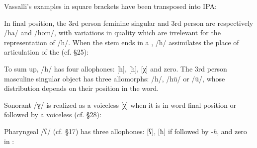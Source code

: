 \documentclass[output=paper]{langsci/langscibook}
\begin{document}
Vassalli's examples in square brackets have been transposed into IPA:



\puechlengths{2cm}{4.5cm}{2.5cm}{1.5cm}{1cm}{1cm}

\ea%
\begin{xlist}
\end{xlist}
\z

In final position, the 3rd person feminine singular and 3rd person  are respectively /ha/ and /hom/, with variations in  quality which are irrelevant for the representation of /h/. When the stem ends in a  , /h/ assimilates the place of articulation of the  (cf. §25):

\ea%
\begin{xlist}
\end{xlist}	
\z

To sum up, /h/ has four allophones: [h], [ħ], [χ] and zero. The 3rd person masculine singular object  has three allomorphs: /h/, /hū/ or /ū/, whose distribution depends on their position in the word.

Sonorant /ɣ/ is realized as a voiceless   [χ] when it is in word final position or followed by a voiceless  (cf. §28):

\ea%
    \label{ex:puech:12}
    \begin{xlist}
    \end{xlist}
\z

Pharyngeal /ʕ/ (cf. §17) has three allophones: [ʕ], [ħ] if followed by  -\textit{h}, and zero in :
\end{document}
